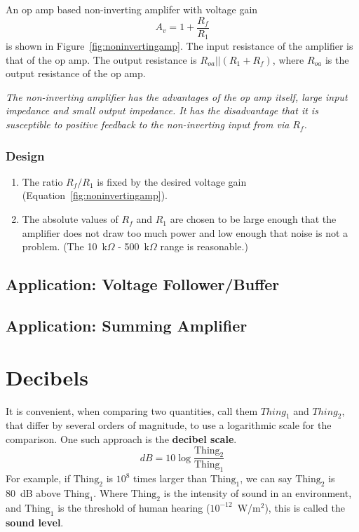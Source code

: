 \documentclass[11pt]{article}
\begin{document}
An op amp based non-inverting amplifer with voltage gain
\begin{equation}
  A_v = 1 + \frac{R_f}{R_1}
  \label{eq:noninvampgain}
\end{equation}
is shown in Figure~\ref{fig:noninvertingamp}. The input resistance of
the amplifier is that of the op amp. The output resistance is
$R_{oa}||(R_1 + R_f)$, where $R_{oa}$ is the output resistance of the
op amp.

\emph{The non-inverting amplifier has the advantages of the op amp
  itself, large input impedance and small output impedance. It has the
  disadvantage that it is susceptible to positive feedback to the
  non-inverting input from via $R_f$.}

\subsubsection*{Design}
\begin{enumerate}
\item The ratio $R_f/R_1$ is fixed by the desired voltage gain
  (Equation~\ref{fig:noninvertingamp}).

\item The absolute values of $R_f$ and $R_1$ are chosen to be large enough
  that the amplifier does not draw too much power and low enough that
  noise is not a problem. (The 10~k$\Omega$ - 500~k$\Omega$ range is
  reasonable.)
\end{enumerate}

\subsection{Application: Voltage Follower/Buffer}
\label{sec:vfollower}

\subsection{Application: Summing Amplifier}
\label{sec:summingamp}



\newpage
\appendix

\section{Decibels}

It is convenient, when comparing two quantities, call them $Thing_1$ 
and $Thing_2$, that differ by several orders of magnitude, to use a
logarithmic scale for the comparison. One such approach is the
\textbf{decibel scale}.
\begin{equation}
  dB = 10 \log \frac{\mathrm{Thing_2}}{\mathrm{Thing_1}}
  \label{eq:db}
\end{equation}
For example, if $\mathrm{Thing_2}$ is $10^8$ times larger than
$\mathrm{Thing_1}$, we can say $\mathrm{Thing_2}$ is 80~dB above
$\mathrm{Thing_1}$. Where $\mathrm{Thing_2}$ is the intensity
of sound in an environment, and $\mathrm{Thing_1}$ is the threshold of
human hearing ($10^{-12}$~W/m$^2$), this is called the
\textbf{sound level}.
\end{document}
